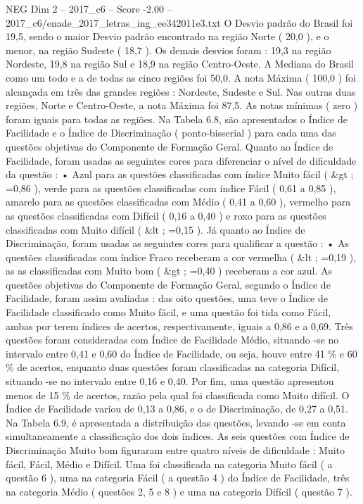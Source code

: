 \begin{textsample}{NEG Dim 2 – 2017\_c6 – Score -2.00 – 2017\_c6/enade\_2017\_letras\_ing\_ee342011e3.txt}
O Desvio padrão do Brasil foi 19,5, sendo o maior Desvio padrão encontrado na região Norte ( 20,0 ), e o menor, na região Sudeste ( 18,7 ).
Os demais desvios foram : 19,3 na região Nordeste, 19,8 na região Sul e 18,9 na região Centro-Oeste.
A Mediana do Brasil como um todo e a de todas as cinco regiões foi 50,0.
A nota Máxima ( 100,0 ) foi alcançada em três das grandes regiões : Nordeste, Sudeste e Sul.
Nas outras duas regiões, Norte e Centro-Oeste, a nota Máxima foi 87,5.
As notas mínimas ( zero ) foram iguais para todas as regiões.
Na Tabela 6.8, são apresentados o Índice de Facilidade e o Índice de Discriminação ( ponto-bisserial ) para cada uma das questões objetivas do Componente de Formação Geral.
Quanto ao Índice de Facilidade, foram usadas as seguintes cores para diferenciar o nível de dificuldade da questão : • Azul para as questões classificadas com índice Muito fácil ( \&gt ; =0,86 ), verde para as questões classificadas com índice Fácil ( 0,61 a 0,85 ), amarelo para as questões classificadas com Médio ( 0,41 a 0,60 ), vermelho para as questões classificadas com Difícil ( 0,16 a 0,40 ) e roxo para as questões classificadas com Muito difícil ( \&lt ; =0,15 ).
Já quanto ao Índice de Discriminação, foram usadas as seguintes cores para qualificar a questão : • As questões classificadas com índice Fraco receberam a cor vermelha ( \&lt ; =0,19 ), as as classificadas com Muito bom ( \&gt ; =0,40 ) receberam a cor azul.
As questões objetivas do Componente de Formação Geral, segundo o Índice de Facilidade, foram assim avaliadas : das oito questões, uma teve o Índice de Facilidade classificado como Muito fácil, e uma questão foi tida como Fácil, ambas por terem índices de acertos, respectivamente, iguais a 0,86 e a 0,69.
Três questões foram consideradas com Índice de Facilidade Médio, situando -se no intervalo entre 0,41 e 0,60 do Índice de Facilidade, ou seja, houve entre 41 \% e 60 \% de acertos, enquanto duas questões foram classificadas na categoria Difícil, situando -se no intervalo entre 0,16 e 0,40.
Por fim, uma questão apresentou menos de 15 \% de acertos, razão pela qual foi classificada como Muito difícil.
O Índice de Facilidade variou de 0,13 a 0,86, e o de Discriminação, de 0,27 a 0,51.
Na Tabela 6.9, é apresentada a distribuição das questões, levando -se em conta simultaneamente a classificação dos dois índices.
As seis questões com Índice de Discriminação Muito bom figuraram entre quatro níveis de dificuldade : Muito fácil, Fácil, Médio e Difícil.
Uma foi classificada na categoria Muito fácil ( a questão 6 ), uma na categoria Fácil ( a questão 4 ) do Índice de Facilidade, três na categoria Médio ( questões 2, 5 e 8 ) e uma na categoria Difícil ( questão 7 ).

\end{textsample}
